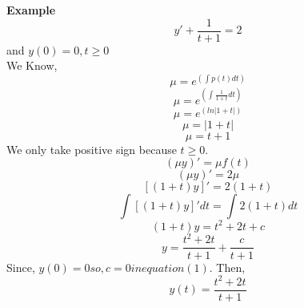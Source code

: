 \documentclass[
  11pt,
]{article}
\begin{document}
\textbf{Example} \[y' + \frac{1}{t+1}=2\] and \(y(0)=0, t \geq 0\)\\
We Know, \[\mu = e^(\int{p(t)dt})\] \[\mu = e^(\int{\frac{1}{1+t}dt})\]
\[\mu = e^(ln|1+t|)\] \[\mu = |1+t|\] \[\mu = t+1\] We only take
positive sign because \(t \geq 0\). \[(\mu y)' = \mu f(t)\]
\[(\mu y)' = 2\mu\] \[[(1+t)y]'=2(1+t)\]
\[\int{[(1+t)y]'dt}=\int{2(1+t)dt}\] \[(1+t)y=t^2+2t+c\]
\[y=\frac{t^2+2t}{t+1}+\frac{c}{t+1} \tag{1}\] Since,
\(y(0)=0 so, c = 0 in equation (1)\). Then,
\[y(t)=\frac{t^2+2t}{t+1} \tag{2}\]
\end{document}
